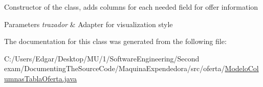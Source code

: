Constructor of the class, adds columns for each needed field for offer information 
\begin{DoxyParams}{Parameters}
{\em trazador} & Adapter for visualization style \\
\hline
\end{DoxyParams}


The documentation for this class was generated from the following file\+:\begin{DoxyCompactItemize}
\item 
C\+:/\+Users/\+Edgar/\+Desktop/\+M\+U/1/\+Software\+Engineering/\+Second exam/\+Documenting\+The\+Source\+Code/\+Maquina\+Expendedora/src/oferta/\mbox{\hyperlink{_modelo_columnas_tabla_oferta_8java}{Modelo\+Columnas\+Tabla\+Oferta.\+java}}\end{DoxyCompactItemize}
